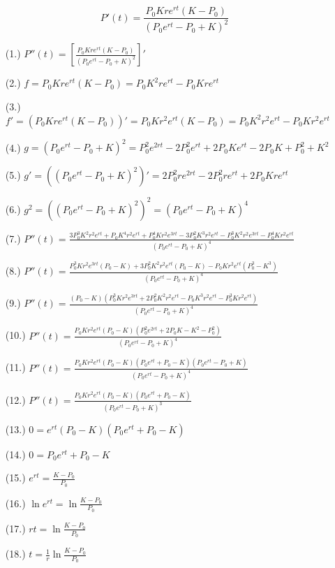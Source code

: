 \begin{appendixes}
    \begin{equation*}
    \boxed{P'(t) = \displaystyle\frac{P_0 K r e^{rt}(K-P_0)}{(P_0 e^{rt} - P_0 + K)^2}}
    \end{equation*}
    
    \begin{enumerate}
    \item [(1.)] $P''(t) = \left[\displaystyle\frac{P_0 K r e^{rt}(K-P_0)}{(P_0 e^{rt} - P_0 + K)^2}\right]'$
    \item [(2.)] $f = P_0 K r e^{rt}(K-P_0) = P_0 K^2 r e^{rt} - P_0 K r e^{rt}$
    \item [(3.)] $f' = (P_0 K r e^{rt}(K-P_0))' = P_0 K r^2 e^{rt}(K-P_0) = P_0 K^2 r^2 e^{rt} - P_0 K r^2 e^{rt}$
    \item [(4.)] $g = (P_0 e^{rt} - P_0 + K)^2 = P_0^2 e^{2rt} - 2P_0^2 e^{rt} + 2P_0 K e^{rt} - 2P_0 K + P_0^2 + K^2$
    \item [(5.)] $g' = ((P_0 e^{rt} - P_0 + K)^2)' = 2P_0^2 r e^{2rt} - 2P_0^2 r e^{rt} + 2P_0 K r e^{rt}$
    \item [(6.)] $g^2 = ((P_0 e^{rt} - P_0 + K)^2)^2 = (P_0 e^{rt} - P_0 + K)^4$
    \item [(7.)] $P''(t) = \displaystyle\frac{3P_0^3 K^2 r^2 e^{rt} + P_0 K^4 r^2 e^{rt} + P_0^4 K r^2 e^{3rt} - 3P_0^2 K^3 r^2 e^{rt} - P_0^3 K^2 r^2 e^{3rt} - P_0^4 K r^2 e^{rt}}{(P_0e^{rt} - P_0 + K)^4}$
    \item [(8.)] $P''(t) = \displaystyle\frac{P_0^3 K r^2 e^{3rt}(P_0-K) + 3P_0^2 K^2 r^2 e^{rt}(P_0-K) - P_0 K r^2 e^{rt}(P_0^3 - K^3)}{(P_0e^{rt} - P_0 + K)^4}$
    \item [(9.)] $P''(t) = \displaystyle\frac{(P_0-K)(P_0^3 K r^2 e^{3rt} + 2P_0^2 K^2 r^2 e^{rt} - P_0 K^3 r^2 e^{rt} - P_0^3 K r^2 e^{rt})}{(P_0e^{rt} - P_0 + K)^4}$
    \item [(10.)] $P''(t) = \displaystyle\frac{P_0 K r^2 e^{rt}(P_0-K)(P_0^2 e^{2rt} + 2P_0 K - K^2 - P_0^2)}{(P_0e^{rt} - P_0 + K)^4}$
    \item [(11.)] $P''(t) = \displaystyle\frac{P_0 K r^2 e^{rt}(P_0-K)(P_0 e^{rt} + P_0 - K)(P_0 e^{rt} - P_0 + K)}{(P_0e^{rt} - P_0 + K)^4}$
    \item [(12.)] $P''(t) = \displaystyle\frac{P_0 K r^2 e^{rt}(P_0-K)(P_0 e^{rt} + P_0 - K)}{(P_0 e^{rt} - P_0 + K)^3}$
    \item [(13.)] $0 = e^{rt}(P_0-K)(P_0 e^{rt} + P_0 - K)$
    \item [(14.)] $0 = P_0 e^{rt} + P_0 - K$
    \item [(15.)] $e^{rt} = \displaystyle\frac{K-P_0}{P_0}$
    \item [(16.)] $\ln e^{rt} = \ln \displaystyle\frac{K-P_0}{P_0}$
    \item [(17.)] $rt = \ln \displaystyle\frac{K-P_0}{P_0}$
    \item [(18.)] $t = \displaystyle\frac{1}{r} \ln \frac{K-P_0}{P_0} $
    \end{enumerate}
    

\end{appendixes}
